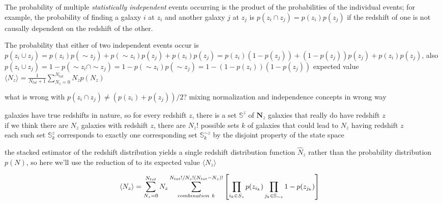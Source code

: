 \begin{definition}
	The probability of multiple \textit{statistically independent} events occurring is the product of the probabilities of the individual events; for example, the probability of finding a galaxy $i$ at $z_{i}$ and another galaxy $j$ at $z_{j}$ is $p(z_{i} \cap z_{j}) = p(z_{i}) p(z_{j})$ if the redshift of one is not causally dependent on the redshift of the other.
\end{definition}
The probability that either of two independent events occur is $p(z_{i} \cup z_{j}) = p(z_{i}) p(\sim z_{j}) + p(\sim z_{i}) p(z_{j}) + p(z_{i}) p(z_{j}) = p(z_{i})(1 - p(z_{j})) + (1 - p(z_{j}))p(z_{j}) + p(z_{i}) p(z_{j})$, also $p(z_{i} \cup z_{j}) = 1 - p(\sim z_{i} \cap \sim z_{j}) = 1 - p(\sim z_{i}) p(\sim z_{j}) = 1 - (1 - p(z_{i})) (1 -p(z_{j}))$
expected value $\langle N_{z} \rangle = \frac{1}{N_{tot}+1} \sum_{N_{z} = 0}^{N_{tot}} N_{z} p(N_{z})$


what is wrong with $p(z_{i} \cap z_{j}) \neq (p(z_{i}) + p(z_{j})) / 2$? mixing normalization and independence concepts in wrong way

galaxies have true redshifts in nature, so for every redshift $z$, there is a set $\mathbb{S}^{z}$ of $\textbf{N}_{z}$ galaxies that really do have redshift $z$\\
if we think there are $N_{z}$ galaxies with redshift $z$, there are $N_{z}!$ possible sets $k$ of galaxies that could lead to $N_{z}$ having redshift $z$\\
each such set $\mathbb{S}_{k}^{z}$ corresponds to exactly one corresponding set $\mathbb{S}_{k}^{\sim z}$ by the disjoint property of the state space


the stacked estimator of the redshift distribution yields a single redshift distribution function $\hat{N}_{z}$ rather than the probability distribution $p(N)$, so here we'll use the reduction of  to its expected value $\langle N_{z} \rangle$

\begin{align}
\eqlabel{eq:complete}
\langle N_{z} \rangle &= \sum_{N_{z} = 0}^{N_{tot}} N_{z} \sum_{combination\ k}^{N_{tot}! / N_{z}! (N_{tot} - N_{z})!} \left[ \prod_{i_{k} \in S_{z}} p(z_{i_{k}}) \prod_{j_{k} \in \mathbb{S}_{\sim z}} 1 - p(z_{j_{k}}) \right]
\end{align}

